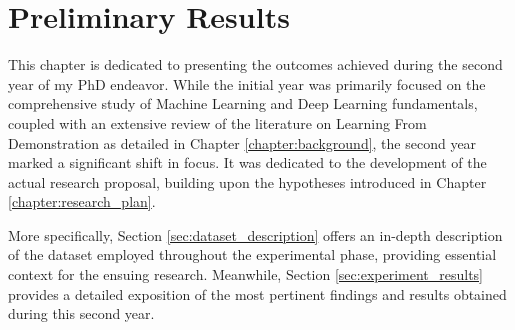 \chapter{Preliminary Results}
\label{chapter:preliminary_results}
This chapter is dedicated to presenting the outcomes achieved during the second year of my PhD endeavor. While the initial year was primarily focused on the comprehensive study of Machine Learning and Deep Learning fundamentals, coupled with an extensive review of the literature on Learning From Demonstration as detailed in Chapter \ref{chapter:background}, the second year marked a significant shift in focus. It was dedicated to the development of the actual research proposal, building upon the hypotheses introduced in Chapter \ref{chapter:research_plan}.

More specifically, Section \ref{sec:dataset_description} offers an in-depth description of the dataset employed throughout the experimental phase, providing essential context for the ensuing research. Meanwhile, Section \ref{sec:experiment_results} provides a detailed exposition of the most pertinent findings and results obtained during this second year.



